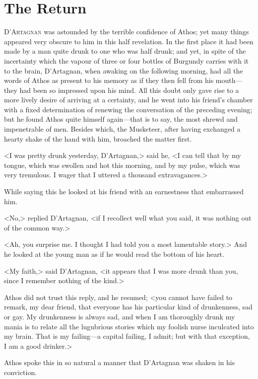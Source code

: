 
\chapter{The Return} 
	
\lettrine{D}{'Artagnan} was astounded by the terrible confidence of Athos; yet many things appeared very obscure to him in this half revelation. In the first place it had been made by a man quite drunk to one who was half drunk; and yet, in spite of the incertainty which the vapour of three or four bottles of Burgundy carries with it to the brain, D'Artagnan, when awaking on the following morning, had all the words of Athos as present to his memory as if they then fell from his mouth—they had been so impressed upon his mind. All this doubt only gave rise to a more lively desire of arriving at a certainty, and he went into his friend's chamber with a fixed determination of renewing the conversation of the preceding evening; but he found Athos quite himself again—that is to say, the most shrewd and impenetrable of men. Besides which, the Musketeer, after having exchanged a hearty shake of the hand with him, broached the matter first. 

<I was pretty drunk yesterday, D'Artagnan,> said he, <I can tell that by my tongue, which was swollen and hot this morning, and by my pulse, which was very tremulous. I wager that I uttered a thousand extravagances.> 

While saying this he looked at his friend with an earnestness that embarrassed him. 

<No,> replied D'Artagnan, <if I recollect well what you said, it was nothing out of the common way.> 

<Ah, you surprise me. I thought I had told you a most lamentable story.> And he looked at the young man as if he would read the bottom of his heart. 

<My faith,> said D'Artagnan, <it appears that I was more drunk than you, since I remember nothing of the kind.> 

Athos did not trust this reply, and he resumed; <you cannot have failed to remark, my dear friend, that everyone has his particular kind of drunkenness, sad or gay. My drunkenness is always sad, and when I am thoroughly drunk my mania is to relate all the lugubrious stories which my foolish nurse inculcated into my brain. That is my failing—a capital failing, I admit; but with that exception, I am a good drinker.> 

Athos spoke this in so natural a manner that D'Artagnan was shaken in his conviction. 


